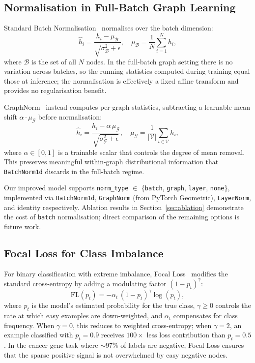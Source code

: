 \subsection{Normalisation in Full-Batch Graph Learning}

Standard Batch Normalisation~\cite{batchnorm2015} normalises over the batch dimension:
\begin{equation}
  \hat{h}_i = \frac{h_i - \mu_\mathcal{B}}{\sqrt{\sigma^2_\mathcal{B} + \epsilon}},
  \quad \mu_\mathcal{B} = \frac{1}{N}\sum_{i=1}^N h_i,
  \label{eq:batchnorm}
\end{equation}
where $\mathcal{B}$ is the set of all $N$ nodes. In the full-batch graph setting there is
no variation across batches, so the running statistics computed during training equal those
at inference; the normalisation is effectively a fixed affine transform and provides no
regularisation benefit.

GraphNorm~\cite{graphnorm2021} instead computes per-graph statistics, subtracting a
learnable mean shift $\alpha \cdot \mu_{\mathcal{G}}$ before normalisation:
\begin{equation}
  \hat{h}_i = \frac{h_i - \alpha\,\mu_{\mathcal{G}}}
              {\sqrt{\sigma^2_{\mathcal{G}} + \epsilon}},
  \quad \mu_{\mathcal{G}} = \frac{1}{|\mathcal{V}|}\sum_{i \in \mathcal{V}} h_i,
  \label{eq:graphnorm}
\end{equation}
where $\alpha \in [0,1]$ is a trainable scalar that controls the degree of mean removal.
This preserves meaningful within-graph distributional information that \texttt{BatchNorm1d}
discards in the full-batch regime.

Our improved model supports \texttt{norm\_type} $\in$ \{\texttt{batch}, \texttt{graph},
\texttt{layer}, \texttt{none}\}, implemented via \texttt{BatchNorm1d}, \texttt{GraphNorm}
(from PyTorch Geometric), \texttt{LayerNorm}, and identity respectively. Ablation results
in Section~\ref{sec:ablation} demonstrate the cost of \texttt{batch} normalisation; direct
comparison of the remaining options is future work.

\subsection{Focal Loss for Class Imbalance}

For binary classification with extreme imbalance, Focal Loss~\cite{focal2017} modifies the
standard cross-entropy by adding a modulating factor $(1-p_t)^\gamma$:
\begin{equation}
  \text{FL}(p_t) = -\alpha_t\,(1-p_t)^\gamma \log(p_t),
  \label{eq:focal_theory}
\end{equation}
where $p_t$ is the model's estimated probability for the true class, $\gamma \ge 0$
controls the rate at which easy examples are down-weighted, and $\alpha_t$ compensates for
class frequency. When $\gamma=0$, this reduces to weighted cross-entropy; when $\gamma=2$,
an example classified with $p_t=0.9$ receives $100\times$ less loss contribution than
$p_t=0.5$. In the cancer gene task where $\sim$97\% of labels are negative, Focal Loss
ensures that the sparse positive signal is not overwhelmed by easy negative nodes.


